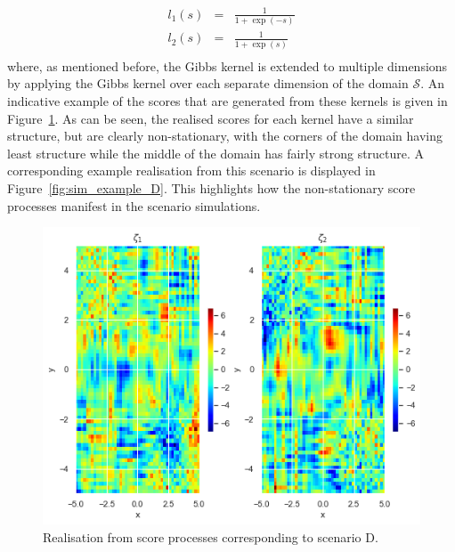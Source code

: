 \begin{eqnarray}
	l_1(s) &=& \frac{1}{1 + \exp(-s)} \nonumber \\
	l_2(s) &=& \frac{1}{1 +  \exp(s)} \nonumber \\
\end{eqnarray}
where, as mentioned before, the Gibbs kernel is extended to multiple dimensions by applying the Gibbs kernel over each separate dimension of the domain $\mathcal{S}$. 
An indicative example of the scores that are generated from these kernels is given in Figure~\ref{fig:sim_ex_zeta_D}. 
As can be seen, the realised scores for each kernel have a similar structure, but are clearly non-stationary, with the corners of the domain having least structure while the middle of the domain has fairly strong structure.
A corresponding example realisation from this scenario is displayed in Figure~\ref{fig:sim_example_D}.
This highlights how the non-stationary score processes manifest in the scenario simulations.

\begin{figure}
	\centering
	\includegraphics[width=\textwidth]{sim_ex_zeta_D}
	\caption[Realisation from score processes corresponding to scenario D.]{Realisation from score processes corresponding to scenario D.}
	\label{fig:sim_ex_zeta_D}
\end{figure}

